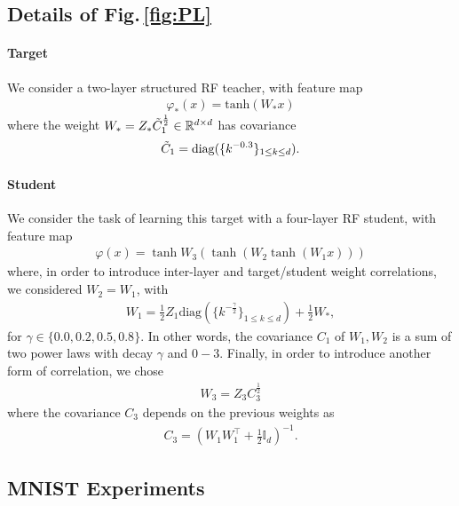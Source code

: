 \subsection{Details of Fig.\,\ref{fig:PL}}

\paragraph{Target} We consider a two-layer structured RF teacher, with feature map
\begin{align}
    \varphi_*(x)=\mathrm{tanh}\left(
    W_*x
    \right)
\end{align}
where the weight $W_*=Z_*\Tilde{C}_1^{\frac{1}{2}} \in\mathbb{R}^{d\times d}$ has covariance
\begin{align}
    \Tilde{C}_1=\mathrm{diag}(\{k^{-0.3}\}_{1\le k\le d}).
\end{align}

\paragraph{Student} We consider the task of learning this target with a four-layer RF student, with feature map
\begin{align}
    \varphi(x)=\tanh W_3(\tanh\left(
    W_2\tanh(W_1x)
    \right))
\end{align}
where, in order to introduce inter-layer and target/student weight correlations, we considered $W_2=W_1$, with
\begin{align}
    W_1=\frac{1}{2}Z_1\mathrm{diag}(\{k^{-\frac{\gamma}{2}}\}_{1\le k\le d})+\frac{1}{2}W_*,
\end{align}
for $\gamma\in\{0.0,0.2,0.5,0.8\}$. In other words, the covariance $C_1$ of $W_1,W_2$ is a sum of two power laws with decay $\gamma$ and $0-3$. Finally, in order to introduce another form of correlation, we chose
\begin{align}
    W_3=Z_3 C_3^{\frac{1}{2}}
\end{align}
where the covariance $C_3$ depends on the previous weights as
\begin{align}
C_3=(W_1W_1^\top +\frac{1}{2}\mathbb{I}_d)^{-1}.
\end{align}


\subsection{MNIST Experiments}
\label{app:real_data}
